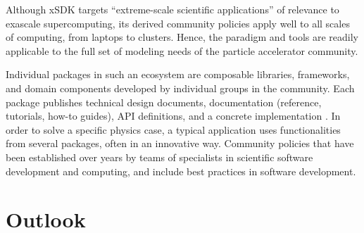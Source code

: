 \documentclass[11pt,sort&compress]{article}
\begin{document}
Although xSDK targets ``extreme-scale scientific applications'' of relevance to exascale supercomputing, its derived community policies apply well to all scales of computing, from laptops to clusters.  Hence, the paradigm and tools are readily applicable to the full set of modeling needs of the particle accelerator community.

Individual packages in such an ecosystem are composable libraries, frameworks, and domain components developed by individual groups in the community.
Each package publishes technical design documents, documentation (reference, tutorials, how-to guides), API definitions, and a concrete implementation \cite{LOI_industry}.  In order to solve a specific physics case, a typical application uses functionalities from several packages, often in an innovative way.  Community policies that have been established over years by teams of specialists in scientific software development and computing, and include best practices in software development.

\section{Outlook}
\end{document}

